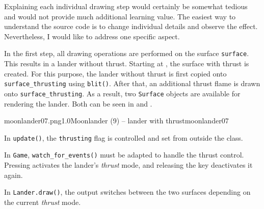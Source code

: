 
Explaining each individual drawing step would certainly be somewhat tedious and would not provide much additional learning value. The easiest way to understand the source code is to change individual details and observe the effect. Nevertheless, I would like to address one specific aspect.

In the first step, all drawing operations are performed on the surface \texttt{surface}. This results in a lander without thrust. Starting at , the surface with thrust is created. For this purpose, the lander without thrust is first copied onto \texttt{surface\_thrusting} using \texttt{blit()}. After that, an additional thrust flame is drawn onto \texttt{surface\_thrusting}. As a result, two \texttt{Surface} objects are available for rendering the lander. Both can be seen in  and .


%
             {moonlander07.png}{1.0}{Moonlander (9) -- lander with thrust}{moonlander07}

In \texttt{update()}, the \texttt{thrusting} flag is controlled and set from outside the class.


In \texttt{Game}, \texttt{watch\_for\_events()} must be adapted to handle the thrust control. Pressing \keys{\SPACE} activates the lander’s \emph{thrust} mode, and releasing the key deactivates it again.


In \texttt{Lander.draw()}, the output switches between the two surfaces depending on the current \emph{thrust} mode.



